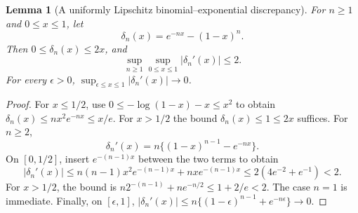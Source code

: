 \documentclass[11pt]{article}
\numberwithin{equation}{section}
\newtheorem{lemma}[theorem]{Lemma}
\theoremstyle{definition}
\theoremstyle{remark}
\begin{document}
\begin{lemma}[A uniformly Lipschitz binomial--exponential discrepancy]\label{lem:delta}
For $n\ge1$ and $0\le x\le1$, let
\[
 \delta_n(x)=e^{-nx}-(1-x)^n.
\]
Then $0\le\delta_n(x)\le2x$, and
\begin{equation}\label{eq:deltabound}
 \sup_{n\ge1}\sup_{0\le x\le1}|\delta_n'(x)|\le2.
\end{equation}
For every $\epsilon>0$,
$\sup_{\epsilon\le x\le1}|\delta_n'(x)|\to0$.
\end{lemma}
\begin{proof}
For $x\le1/2$, use
$0\le-\log(1-x)-x\le x^2$ to obtain
$\delta_n(x)\le nx^2e^{-nx}\le x/e$. For $x>1/2$ the bound
$\delta_n(x)\le1\le2x$ suffices.
For $n\ge2$,
\[
 \delta_n'(x)=n\{(1-x)^{n-1}-e^{-nx}\}.
\]
On $[0,1/2]$, insert $e^{-(n-1)x}$ between the two terms to obtain
\[
 |\delta_n'(x)|
 \le n(n-1)x^2e^{-(n-1)x}+nxe^{-(n-1)x}
 \le2(4e^{-2}+e^{-1})<2.
\]
For $x>1/2$, the bound is
$n2^{-(n-1)}+ne^{-n/2}\le1+2/e<2$.
The case $n=1$ is immediate. Finally, on $[\epsilon,1]$,
$|\delta_n'(x)|\le n\{(1-\epsilon)^{n-1}+e^{-n\epsilon}\}\to0$.
\end{proof}
\end{document}

